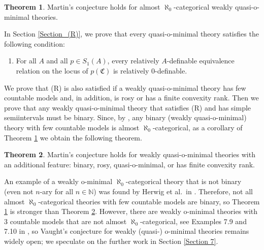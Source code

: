 \documentclass{amsart}
\theoremstyle{definition}
\theoremstyle{definition}
\newtheorem{Theorem1}{Theorem}
\newcommand{\Mon}{\mathfrak C}
\begin{document}
\begin{Theorem1}\label{Theorem_AAC}
Martin's conjecture holds for almost $\aleph_0$-categorical weakly quasi-o-minimal theories.    
\end{Theorem1}



In Section \ref{Section_(R)}, we prove that every quasi-o-minimal theory satisfies the following condition:
\begin{enumerate}
    \item[(R)] For all $A$ and all $p\in S_1(A)$, every relatively $A$-definable equivalence relation on the locus of $p(\Mon)$ is relatively $0$-definable.
\end{enumerate}
We prove that (R) is also satisfied if a weakly quasi-o-minimal theory has few countable models and, in addition, is rosy or has a finite convexity rank. Then we prove that any weakly quasi-o-minimal theory that satisfies (R) and has simple semiintervals must be binary. Since, by \cite[Lemma 8.1]{MT}, any binary (weakly quasi-o-minimal) theory with few countable models is almost $\aleph_0$-categorical, as a corollary of Theorem \ref{Theorem_AAC} we obtain the following theorem. 

\begin{Theorem1}\label{Theorem_bin_ros_quasio} 
Martin's conjecture holds for weakly quasi-o-minimal theories with an additional feature: binary, rosy, quasi-o-minimal, or has finite convexity rank.
\end{Theorem1} 

 
An example of a weakly o-minimal $\aleph_0$-categorical theory that is not binary (even not $n$-ary for all $n\in\mathbb N$) was found by Herwig et al.\ in \cite{Herwig}. Therefore, not all almost $\aleph_0$-categorical theories with few countable models are binary, so
Theorem \ref{Theorem_AAC} is stronger than Theorem \ref{Theorem_bin_ros_quasio}. However, there are weakly o-minimal theories with 3 countable models that are not almost $\aleph_0$-categorical, see Examples 7.9 and 7.10 in \cite{MTwqom1}, so Vaught's conjecture for weakly (quasi-) o-minimal theories remains widely open; we speculate on the further work in Section \ref{Section 7}.
\end{document}
